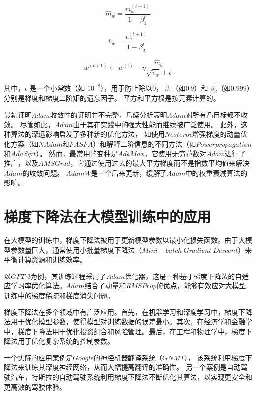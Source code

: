 \documentclass[printMode=false, declarePage=false]{ecnuthesis}
\begin{document}
    \begin{equation}
        \hat{m}_w = \frac{m_w^{(t+1)}}{1 - \beta_1^t}
    \end{equation}
        
    \begin{equation}
        \hat{v}_w = \frac{v_w^{(t+1)}}{1 - \beta_2^t}
    \end{equation}
        
    \begin{equation}
        w^{(t+1)} \leftarrow w^{(t)} - \eta \frac{\hat{m}_w}{\sqrt{\hat{v}_w} + \epsilon}
    \end{equation}

    其中，\(\epsilon\) 是一个小常数（如 \(10^{-8}\)），用于防止除以$0$，
    \(\beta_1\)（如$0.9$）和 \(\beta_2\)（如$0.999$）分别是梯度和梯度二阶矩的遗忘因子。
    平方和平方根是按元素计算的。

    最初证明$Adam$收敛性的证明并不完整，后续分析表明$Adam$对所有凸目标\cite{reddi2018convergence, rubio2017convergence}都不收敛。
    尽管如此，$Adam$由于其在实践中的强大性能而继续被广泛使用。
    此外，这种算法的深远影响启发了多种新的优化方法，
    如使用$Nesterov$增强梯度的动量优化方案（如$NAdam$和$FASFA$）和解释二阶信息的不同方法（如$Powerpropagation$和$AdaSqrt$）。
    然而，最常用的变种是$AdaMax$\cite{kingma2015adam}，它使用无穷范数对$Adam$进行了推广，以及$AMSGrad$，它通过使用过去的最大平方梯度而不是指数平均值来解决$Adam$的收敛问题。
    $AdamW$是一个后来更新，缓解了$Adam$中的权重衰减算法的影响。\cite{ruder2017optimizing}

    \section{梯度下降法在大模型训练中的应用}
    在大模型的训练中，梯度下降法被用于更新模型参数以最小化损失函数。由于大模型参数量巨大，通常使用小批量梯度下降法（$Mini-batch\ Gradient\ Descent$）来平衡计算资源和训练效率\cite{hinton2012neural}。

    以$GPT$-$3$为例，其训练过程采用了$Adam$优化器，这是一种基于梯度下降法的自适应学习率优化算法。$Adam$结合了动量和$RMSProp$的优点，能够有效应对大模型训练中的梯度稀疏和梯度消失问题\cite{kingma2015adam}。

    梯度下降法在多个领域中有广泛应用。首先，在机器学习和深度学习中，梯度下降法用于优化模型参数，使得模型对训练数据的误差最小。其次，在经济学和金融学中，梯度下降法用于优化投资组合和风险管理。最后，在工程和物理学中，梯度下降法用于优化复杂系统的控制参数。

    一个实际的应用案例是$Google$的神经机器翻译系统（$GNMT$）\cite{zulaika2022students}，
    该系统利用梯度下降法来训练其深度神经网络，从而大幅提高翻译的准确性。
    另一个案例是自动驾驶汽车，特斯拉的自动驾驶系统利用梯度下降法不断优化其算法，以实现更安全和更高效的驾驶体验。
\end{document}
